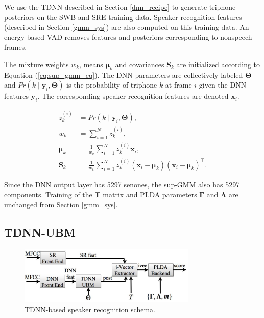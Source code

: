 \documentclass{article}
\begin{document}
We use the TDNN described in Section \ref{dnn_recipe} to generate triphone posteriors on the SWB and SRE
training data. Speaker
recognition features (described in Section \ref{gmm_sys}) are also computed on this training data.
An energy-based VAD removes features and posteriors corresponding to nonspeech frames.

The mixture weights $w_{k}$, means $\boldsymbol{\mu}_{k}$ 
and covariances $\boldsymbol{S}_{k}$ are initialized according
to Equation (\ref{eq:sup_gmm_eq}). The DNN parameters are collectively
labeled $\boldsymbol{\Theta}$ and 
$Pr(k \mid \boldsymbol{y}_{i}, \boldsymbol{\Theta})$ is the
probability of triphone $k$ at frame $i$ given the DNN features $\boldsymbol{y}_{i}$. The
corresponding speaker recognition features are denoted $\boldsymbol{x}_{i}$.

\begin{equation}
\label{eq:sup_gmm_eq} 
\begin{split}
z_{k}^{(i)} &= Pr(k \mid \boldsymbol{y}_{i}, \boldsymbol{\Theta}), \\
w_{k} &= \sum_{i=1}^{N}z_{k}^{(i)},\\
\boldsymbol{\mu}_{k} &= \frac{1}{w_{k}} \sum_{i=1}^{N} z_{k}^{(i)} \boldsymbol{x}_{i},\\
\boldsymbol{S}_{k} &= \frac{1}{w_{k}} \sum_{i=1}^{N} z_{k}^{(i)} (\boldsymbol{x}_{i} - \boldsymbol{\mu}_{k}) (\boldsymbol{x}_{i} - \boldsymbol{\mu}_{k})^{\top}.
\end{split}
\end{equation}

Since the DNN output layer has 5297 senones, the sup-GMM also has 5297
components. 
Training of the $\boldsymbol{T}$ matrix
and PLDA parameters $\boldsymbol{\Gamma}$ and $\boldsymbol{\Lambda}$ are unchanged from Section \ref{gmm_sys}.

\subsection{TDNN-UBM}

\begin{figure}[th]
\centerline{\includegraphics[width=8.5cm]{fig/dnn_schema}}
\caption{TDNN-based speaker recognition schema.}
\label{fig:dnn_schema}
\end{figure}
\end{document}
